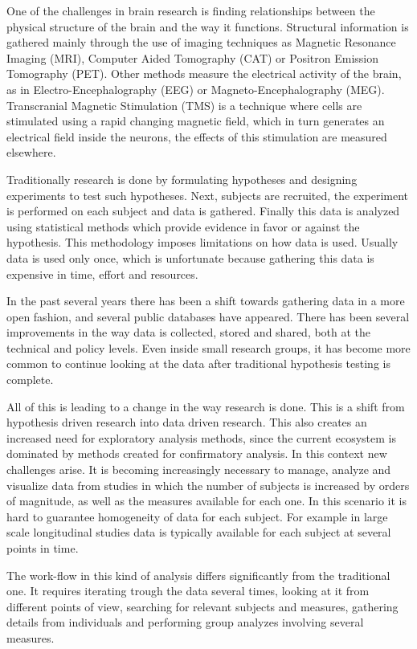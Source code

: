 

One of the challenges in brain research is finding relationships between the physical structure of the brain and the way it functions. Structural information is gathered mainly through the use of imaging techniques as Magnetic Resonance Imaging (MRI), Computer Aided Tomography (CAT) or Positron Emission Tomography (PET). Other methods measure the electrical activity of the brain, as in Electro-Encephalography  (EEG) or Magneto-Encephalography (MEG). Transcranial Magnetic Stimulation (TMS) is a technique where cells are stimulated using a rapid changing magnetic field, which in turn generates an electrical field inside the neurons, the effects of this stimulation are measured elsewhere. 

Traditionally research is done by formulating hypotheses and designing experiments to test such hypotheses. Next, subjects are recruited, the experiment is performed on each subject and data is gathered. Finally this data is analyzed using statistical methods which provide evidence in favor or against the hypothesis. This methodology imposes limitations on how data is used. Usually data is used only once, which is unfortunate because gathering this data is expensive in time, effort and resources. 

In the past several years there has been a shift towards gathering data in a more open fashion, and several public databases have appeared. There has been several improvements in the way data is collected, stored and shared, both at the technical and policy levels. Even inside small research groups, it has become more common to continue looking at the data after traditional hypothesis testing is complete. 

All of this is leading to a change in the way research is done. This is a shift from hypothesis driven research into data driven research. This also creates an increased need for exploratory analysis methods, since the current ecosystem is dominated by methods created for confirmatory analysis. In this context new challenges arise. It is becoming increasingly necessary to manage, analyze and visualize data from studies in which the number of subjects is increased by orders of magnitude, as well as the measures available for each one. In this scenario it is hard to guarantee homogeneity of data for each subject. For example in large scale longitudinal studies data is typically available for each subject at several points in time. 

The work-flow in this kind of analysis differs significantly from the traditional one. It requires iterating trough the data several times, looking at it from different points of view, searching for relevant subjects and measures, gathering details from individuals and performing group analyzes involving several measures. 

